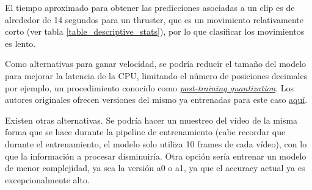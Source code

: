 El tiempo aproximado para obtener las predicciones asociadas a un clip es de alrededor de 14 segundos para un thruster, que es un movimiento relativamente corto (ver tabla \ref{table_descriptive_stats}), por lo que clasificar los movimientos es lento.

Como alternativas para ganar velocidad, se podría reducir el tamaño del modelo para mejorar la latencia de la CPU, limitando el número de posiciones decimales por ejemplo, un procedimiento conocido como \href{https://www.tensorflow.org/lite/performance/post_training_quantization}{\textit{post-training quantization}}. Los autores originales ofrecen versiones del mismo ya entrenadas para este caso \href{https://tfhub.dev/google/collections/movinet/1}{aquí}.

Existen otras alternativas. Se podría hacer un muestreo del vídeo de la misma forma que se hace durante la pipeline de entrenamiento (cabe recordar que durante el entrenamiento, el modelo solo utiliza 10 frames de cada vídeo), con lo que la información a procesar disminuiría. Otra opción sería entrenar un modelo de menor complejidad, ya sea la versión a0 o a1, ya que el accuracy actual ya es excepcionalmente alto.



